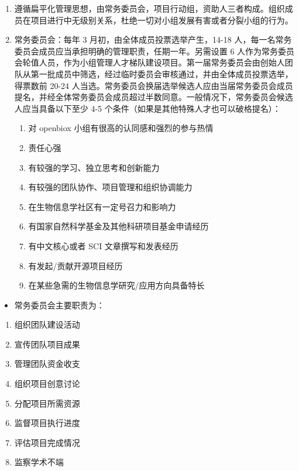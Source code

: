 \documentclass[]{article}
\providecommand{\tightlist}{%
  \setlength{\itemsep}{0pt}\setlength{\parskip}{0pt}}
\begin{document}
\begin{enumerate}
\def\labelenumi{\arabic{enumi}.}
\item
  遵循扁平化管理思想，由常务委员会，项目行动组，资助人三者构成。组织成员在项目进行中无级别关系，杜绝一切对小组发展有害或者分裂小组的行为。
\item
  常务委员会：每年 3 月初，由全体成员投票选举产生，14-18
  人，每一名常务委员会成员应当承担明确的管理职责，任期一年。另需设置 6
  人作为常务委员会轮值人员，作为小组管理人才梯队建设项目。第一届常务委员会由创始人团队从第一批成员中筛选，经过临时委员会审核通过，并由全体成员投票选举，得票数前
  20-24
  人当选。常务委员会换届选举候选人应由当届常务委员会成员提名，并经全体常务委员会成员超过半数同意。一般情况下，常务委员会候选人应当具备以下至少
  4-5 个条件（如果是其他特殊人才也可以破格提名）：

  \begin{enumerate}
  \def\labelenumii{\alph{enumii})}
  \tightlist
  \item
    对 openbiox 小组有很高的认同感和强烈的参与热情
  \item
    责任心强
  \item
    有较强的学习、独立思考和创新能力
  \item
    有较强的团队协作、项目管理和组织协调能力
  \item
    在生物信息学社区有一定号召力和影响力
  \item
    有国家自然科学基金及其他科研项目基金申请经历
  \item
    有中文核心或者 SCI 文章撰写和发表经历
  \item
    有发起/贡献开源项目经历
  \item
    在某些急需的生物信息学研究/应用方向具备特长
  \end{enumerate}
\end{enumerate}

\begin{itemize}
\tightlist
\item
  常务委员会主要职责为：
\end{itemize}

\begin{enumerate}
\def\labelenumi{\alph{enumi})}
\tightlist
\item
  组织团队建设活动
\item
  宣传团队项目成果
\item
  管理团队资金收支
\item
  组织项目创意讨论
\item
  分配项目所需资源
\item
  监督项目执行进度
\item
  评估项目完成情况
\item
  监察学术不端
\end{enumerate}
\end{document}
